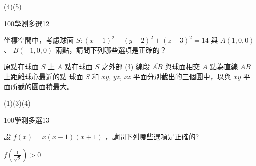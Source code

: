 \begin{QUESTIONS}
\begin{QUESTION}
        \begin{QANS}
            (4)(5)
        \end{QANS}
        \begin{QSOLLIST}
        \end{QSOLLIST}
        \begin{QEMPTYSPACE}
        \end{QEMPTYSPACE}
    \end{QUESTION}
    \begin{QUESTION}
        \begin{ExamInfo}{100}{學測}{多選}{12}
        \end{ExamInfo}
        \begin{ExamAnsRateInfo}{54}{84}{53}{25}
        \end{ExamAnsRateInfo}
        \begin{QBODY}
			坐標空間中，考慮球面 $S:(x-1)^2+(y-2)^2+(z-3)^2 = 14 $ 與 $A(1,0,0)$ 、 $B(-1,0,0)$ 兩點，請問下列哪些選項是正確的？ 
			\begin{QOPS} 
				\QOP 原點在球面 $S$ 上 
				\QOP $A$ 點在球面 $S$ 之外部 (3) 線段 $\overline{AB}$ 與球面相交 
				\QOP $A$ 點為直線 $AB$ 上距離球心最近的點  
				\QOP 球面 $S$ 和 $xy$, $yz$, $xz$ 平面分別截出的三個圓中，以與 $xy$ 平面所截的圓面積最大。
			\end{QOPS}
        \end{QBODY}
        \begin{QFROMS}
        \end{QFROMS}
        \begin{QTAGS}\end{QTAGS}
        \begin{QANS}
            (1)(3)(4)
        \end{QANS}
        \begin{QSOLLIST}
        \end{QSOLLIST}
        \begin{QEMPTYSPACE}
        \end{QEMPTYSPACE}
    \end{QUESTION}
    \begin{QUESTION}
        \begin{ExamInfo}{100}{學測}{多選}{13}
        \end{ExamInfo}
        \begin{ExamAnsRateInfo}{39}{64}{32}{21}
        \end{ExamAnsRateInfo}
        \begin{QBODY}
		設 $f(x) = x(x -1)(x +1)$ ，請問下列哪些選項是正確的? 
			\begin{QOPS} 
				\QOP $f(\frac{1}{\sqrt{2}})>0$


\end{QOPS}
\end{QBODY}
\end{QUESTION}
\end{QUESTIONS}
